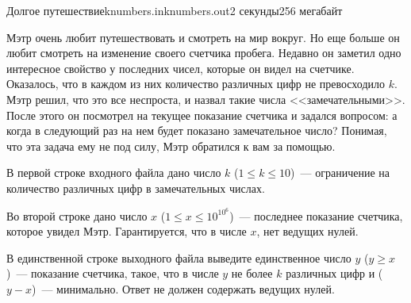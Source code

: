 \begin{problem}{Долгое путешествие}{knumbers.in}{knumbers.out}{2 секунды}{256 мегабайт}
                                                                    

Мэтр очень любит путешествовать и смотреть на мир вокруг. Но еще больше он любит смотреть на изменение своего счетчика пробега.
Недавно он заметил одно интересное свойство у последних чисел, которые он видел на счетчике.
Оказалось, что в каждом из них количество различных цифр не превосходило $k$. Мэтр решил, что это все неспроста, и
назвал такие числа <<замечательными>>. После этого он посмотрел на текущее показание
счетчика и задался вопросом: а когда в следующий раз на нем будет показано замечательное число? Понимая, что эта задача
ему не под силу, Мэтр обратился к вам за помощью.

\InputFile
В первой строке входного файла дано число $k$ ($1 \le k \le 10$)~--- ограничение на количество различных цифр в замечательных числах.

Во второй строке дано число $x$ ($1 \le x \le 10^{10^6}$)~--- последнее показание счетчика, которое увидел Мэтр. Гарантируется, что в числе $x$,
нет ведущих нулей.
                                                 
\OutputFile
В единственной строке выходного файла выведите единственное число $y$ ($y \ge x$)~--- показание счетчика, такое, что в
числе $y$ не более $k$ различных цифр и ($y-x$)~--- минимально. Ответ не должен содержать ведущих нулей.

\Example
\begin{example}%
%
%
%
\end{example}

\end{problem}